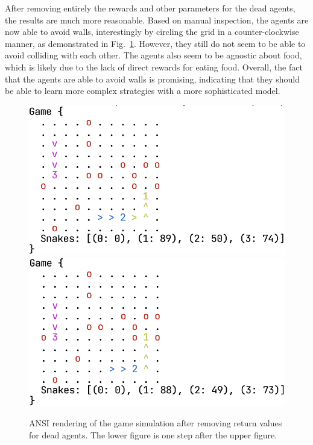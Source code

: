 \documentclass[conference]{IEEEtran}
\begin{document}
After removing entirely the rewards and other parameters for the dead agents,
the results are much more reasonable. Based on manual inspection,
the agents are now able to avoid walls,
interestingly by circling the grid in a counter-clockwise manner,
as demonstrated in Fig.~\ref{fig:render2}. However,
they still do not seem to be able to avoid colliding with each other.
The agents also seem to be agnostic about food,
which is likely due to the lack of direct rewards for eating food. Overall,
the fact that the agents are able to avoid walls is promising,
indicating that they should be able to learn more complex strategies with a more
sophisticated model.

\begin{figure}
    \centering
    \includegraphics[width=\linewidth]{game_render_eg2.png}\\[12pt]
    \includegraphics[width=\linewidth]{game_render_eg3.png}
    \caption{ANSI rendering of the game simulation after removing return values
        for dead agents. The lower figure is one step after the upper figure.
    }
    \label{fig:render2}
\end{figure}
\end{document}
